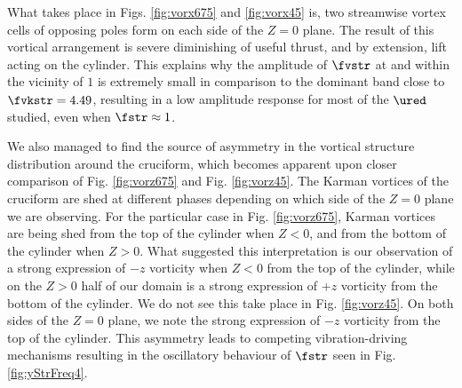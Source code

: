 \documentclass[a4paper,fleqn]{cas-sc}
\begin{document}
What takes place in Figs. \ref{fig:vorx675} and \ref{fig:vorx45} is, two streamwise vortex cells of opposing poles form on each side of the $Z = 0$ plane. The result of this vortical arrangement is severe diminishing of useful thrust, and by extension, lift acting on the cylinder. This explains why the amplitude of $\fvstr$ at and within the vicinity of $1$ is extremely small in comparison to the dominant band close to $\fvkstr = 4.49$, resulting in a low amplitude response for most of the $\ured$ studied, even when $\fstr \approx 1$.

We also managed to find the source of asymmetry in the vortical structure distribution around the cruciform, which becomes apparent upon closer comparison of Fig. \ref{fig:vorz675} and Fig. \ref{fig:vorz45}. The Karman vortices of the \angfo{} cruciform are shed at different phases depending on which side of the $Z = 0$ plane we are observing. For the particular case in Fig. \ref{fig:vorz675}, Karman vortices are being shed from the top of the cylinder when $Z < 0$, and from the bottom of the cylinder when $Z > 0$. What suggested this interpretation is our observation of a strong expression of $-z$ vorticity when $Z < 0$ from the top of the cylinder, while on the $Z > 0$ half of our domain is a strong expression of $+z$ vorticity from the bottom of the cylinder. We do not see this take place in Fig. \ref{fig:vorz45}. On both sides of the $Z = 0$ plane, we note the strong expression of $-z$ vorticity from the top of the cylinder. This asymmetry leads to competing vibration-driving mechanisms resulting in the oscillatory behaviour of $\fstr$ seen in Fig. \ref{fig:yStrFreq4}.
\end{document}
